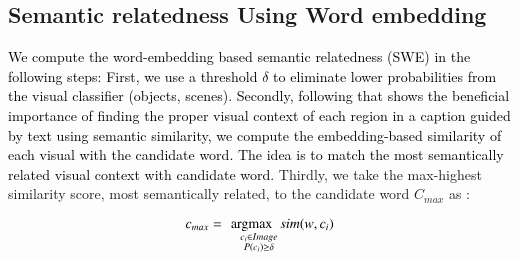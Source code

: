 \documentclass[phd,tocprelim]{cornell}
\DeclareMathOperator*{\argmax}{argmax}
\begin{document}



\subsection{Semantic relatedness Using Word embedding}
\textcolor{black}{We compute the word-embedding based semantic relatedness (SWE) in the following steps: First, we use a threshold $\delta$ to eliminate lower probabilities from the visual classifier (objects, scenes). Secondly, following  \cite{lee2018stacked} that shows the beneficial importance of finding the proper visual context of each region in a caption guided by text using semantic similarity,  we compute the embedding-based similarity of each visual with the candidate word. The idea is to match the most semantically related visual context with candidate word.} 
Thirdly, we take the max-highest similarity score, most semantically related, to the candidate word $C_{max}$ as :

\begin{equation}
    c_{max}= \argmax_{%
       \substack{%
         \phantom{\text{s.\,t.}}\, c_i \in Image \\  
         \phantom{\text{s.\,t.}}\, P(c_i) \geq \delta   
       }
     }
     sim(w,c_i) %
   \end{equation}
\end{document}
